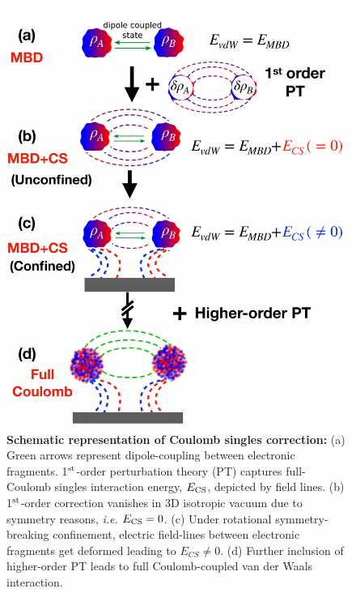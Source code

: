 \documentclass[aps,prl,groupaddress, twocolumn]{revtex4-1}
\begin{document}
\begin{figure}[h]
\includegraphics[scale=0.45]{Plots/Schematic_new.pdf}
\caption{\textbf{Schematic representation of Coulomb singles correction:} (a) Green arrows represent dipole-coupling between electronic fragments. 1$^{\rm st}$-order perturbation theory (PT) captures full-Coulomb singles interaction energy, $E_{\rm CS}$, depicted by field lines. (b) 1$^{\rm st}$-order correction vanishes in 3D isotropic vacuum due to symmetry reasons, \textit{i.e.} $E_{\rm CS} = 0$. (c) Under rotational symmetry-breaking confinement, electric field-lines between electronic fragments get deformed leading to $E_{CS} \neq 0$. (d) Further inclusion of higher-order PT leads to full Coulomb-coupled van der Waals interaction.}\label{fig:schematic}
\end{figure}
\end{document}
